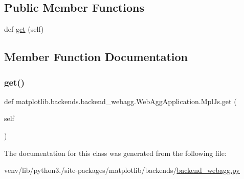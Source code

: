 \subsection*{Public Member Functions}
\begin{DoxyCompactItemize}
\item 
def \hyperlink{classmatplotlib_1_1backends_1_1backend__webagg_1_1WebAggApplication_1_1MplJs_a7814fbd182723967997095efe5c1819d}{get} (self)
\end{DoxyCompactItemize}


\subsection{Member Function Documentation}
\mbox{\label{classmatplotlib_1_1backends_1_1backend__webagg_1_1WebAggApplication_1_1MplJs_a7814fbd182723967997095efe5c1819d}} 
\subsubsection{\texorpdfstring{get()}{get()}}
{\footnotesize\ttfamily def matplotlib.\+backends.\+backend\+\_\+webagg.\+Web\+Agg\+Application.\+Mpl\+Js.\+get (\begin{DoxyParamCaption}\item[{}]{self }\end{DoxyParamCaption})}



The documentation for this class was generated from the following file\+:\begin{DoxyCompactItemize}
\item 
venv/lib/python3./site-\/packages/matplotlib/backends/\hyperlink{backend__webagg_8py}{backend\+\_\+webagg.\+py}\end{DoxyCompactItemize}
